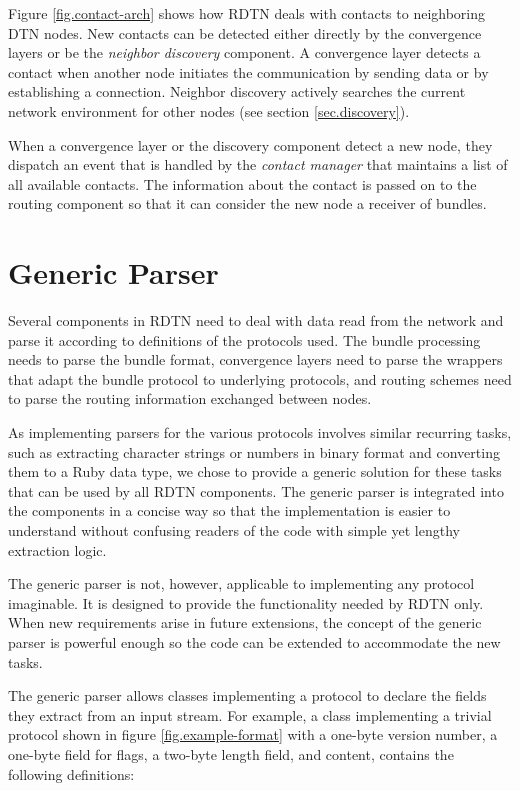 \documentclass[a4paper]{article}
\begin{document}
Figure \ref{fig.contact-arch} shows how RDTN deals with contacts to neighboring
DTN nodes. New contacts can be detected either directly by the convergence
layers or be the {\em neighbor discovery} component. A convergence layer detects
a contact when another node initiates the communication by sending data or by
establishing a connection.  Neighbor discovery actively searches the current
network environment for other nodes (see section \ref{sec.discovery}).

When a convergence layer or the discovery component detect a new node, they
dispatch an event that is handled by the {\em contact manager} that maintains a
list of all available contacts. The information about the contact is passed on
to the routing component so that it can consider the new node a receiver of
bundles.

\section{Generic Parser}\label{sec.genparser}

Several components in RDTN need to deal with data read from the network and parse it
according to definitions of the protocols used. The bundle processing needs to
parse the bundle format, convergence layers need to parse the wrappers that
adapt the bundle protocol to underlying protocols, and routing schemes need to
parse the routing information exchanged between nodes.

As implementing parsers for the various protocols involves similar recurring
tasks, such as extracting character strings or numbers in binary format and
converting them to a Ruby data type, we chose to provide a generic solution for
these tasks that can be used by all RDTN components. The generic parser is
integrated into the components in a concise way so that
the implementation is easier to understand without confusing readers of the code
with simple yet lengthy extraction logic. 

The generic parser is not, however, applicable to implementing any protocol
imaginable. It is designed to provide the functionality needed by RDTN only.
When new requirements arise in future extensions, the concept of the generic
parser is powerful enough so the code can be extended to accommodate the new
tasks.

The generic parser allows classes implementing a protocol to declare the fields
they extract from an input stream. For example, a class implementing a trivial
protocol shown in figure \ref{fig.example-format} with a one-byte version
number, a one-byte field for flags, a two-byte length field, and content,
contains the following definitions:
\end{document}
